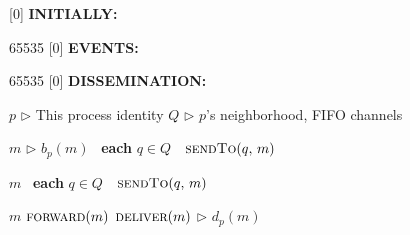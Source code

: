 
[0] {\textbf{INITIALLY:}}

{65535}{}
[0] {\textbf{EVENTS:}}

{65535}{}
[0] {\textbf{DISSEMINATION:}}


\newcommand{\comment}[1]{$\rhd$ #1}
\newcommand{\LINEIFTHEN}[2]{%
  \algorithmicif\ {#1}\ \algorithmicthen\ {#2} %
}
\newcommand{\LINEIFTHENELSE}[3]{%
  \algorithmicif\ {#1}\ \algorithmicthen\ {#2} \algorithmicelse\ {#3}%
}

\newcommand{\LINEFOR}[2]{%
  \algorithmicfor\ {#1}\ \algorithmicdo\ {#2} %
}

\begin{algorithmic}[1]

  \initially
  \State $p$ \hfill \comment{This process identity}
  \State $Q$ \hfill \comment{$p$'s neighborhood, FIFO channels}
  \endInitially
  
  \dissemination

   {$m$} \hfill \comment{$b_p(m)$}
  \State \LINEFOR{\textbf{each} $q \in Q$} 
  {$\textsc{sendTo}(q,\, m)$}
  \EndFunction
  
  \Statex

   {$m$}
  \State \LINEFOR{\textbf{each} $q \in Q$} 
  {$\textsc{sendTo}(q,\, m)$}
  \EndFunction

  \Statex
  
   {$m$}  
  \State $\textsc{forward}(m)$
  \State $\textsc{deliver}(m)$ \hfill \comment{$d_p(m)$}
  \EndIf

  \EndFunction

\end{algorithmic}


